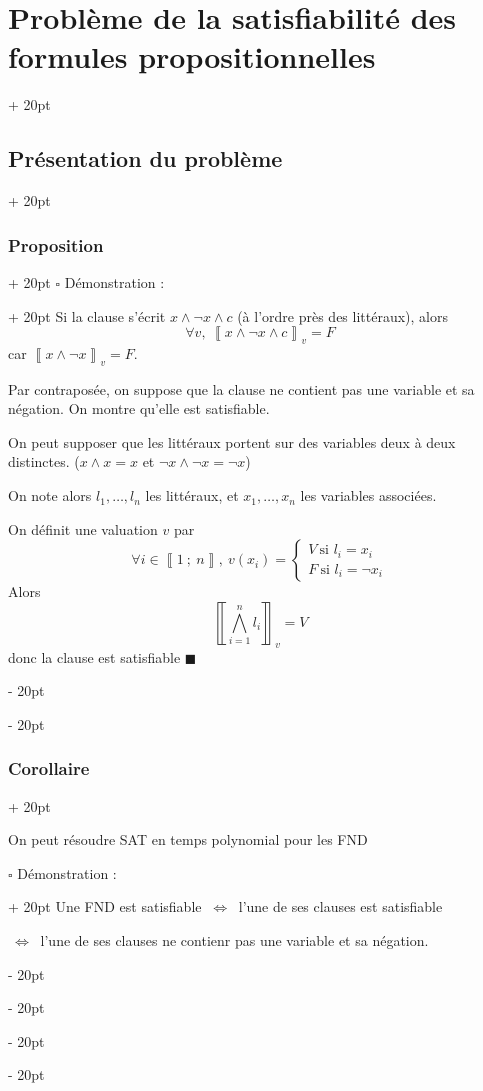 \documentclass[a4paper, 12pt, twoside]{article}
\newcommand{\nset}[2]{\left\llbracket #1\ ;\ #2 \right\rrbracket}
\newcommand{\lrbb}[1]{\left\llbracket #1 \right\rrbracket}
\newcommand{\ssi}{\ \Leftrightarrow \ }
\newcommand{\eqsys}[2]{\begin{cases} #1 \\ #2 \end{cases}}
\newcommand{\ind}[1][20pt]{\advance\leftskip + #1}
\newcommand{\deind}[1][20pt]{\advance\leftskip - #1}
\newenvironment{indt}[2][20pt]{#2 \par \ind[#1]}{\par \deind} %
\begin{document}
\begin{indt}{\section{Problème de la satisfiabilité des formules propositionnelles}}
\begin{indt}{\subsection{Présentation du problème}}
\begin{indt}{\subsubsection{Proposition}}
                \begin{indt}{$\square$ Démonstration :}
                    \boxed{\Leftarrow} Si la clause s'écrit $x \wedge \neg x \wedge c$ (à l'ordre près des littéraux), alors
                        \[ \forall v,\ \lrbb{x \wedge \neg x \wedge c}_v = F \]
                    car $\lrbb{x \wedge \neg x}_v = F$.
                    
                    \vspace{12pt}
                    
                    \boxed{\Rightarrow} Par contraposée, on suppose que la clause ne contient pas une variable et sa négation. On montre qu'elle est satisfiable.
                    
                    On peut supposer que les littéraux portent sur des variables deux à deux distinctes. ($x \wedge x = x$ et $\neg x \wedge \neg x =\neg x $)
                    
                    On note alors $l_1, \ldots, l_n$ les littéraux, et $x_1, \ldots, x_n$ les variables associées.
                    
                    On définit une valuation $v$ par
                        \[ \forall i \in \nset 1 n,\ v(x_i) = \eqsys{V\ \text{si $l_i = x_i$}}{F\ \text{si $l_i = \neg x_i$}} \]
                    Alors
                        \[ \lrbb{\bigwedge_{i = 1}^n l_i}_v = V \]
                    donc la clause est satisfiable $\blacksquare$
                \end{indt}
            \end{indt}
            
            \vspace{12pt}
            
            \begin{indt}{\subsubsection{Corollaire}}
                \begin{pseudocode}
                    On peut résoudre SAT en temps polynomial pour les FND
                \end{pseudocode}
                
                \begin{indt}{$\square$ Démonstration :}
                    Une FND est satisfiable $\ssi$ l'une de ses clauses est satisfiable
                    
                    $\ssi$ l'une de ses clauses ne contienr pas une variable et sa négation.
                    

\end{indt}
\end{indt}
\end{indt}
\end{indt}
\end{document}
